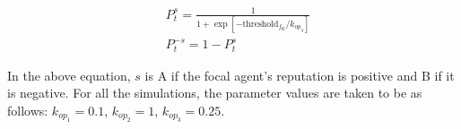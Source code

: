\documentclass[11pt, A4 paper, twocolumn ]{article}
\newcommand{\frm}{f_{\text{R}}}
\begin{document}
\begin{equation} \label{eq:optrfn2}
	\begin{split}
		&P_{t}^{s} = 	\frac{1}{1 + \exp[-\text{threshold}_{\frm}/k_{op_{3}}]} \\
		&P_{t}^{-s} = 1- P_{t}^{s}
	\end{split}
\end{equation}

In the above equation, $ s $ is A if the focal agent's reputation is positive and B if it is negative. For all the simulations, the parameter values are taken to be as follows: $ k_{op_{1}} = 0.1$, $ k_{op_{2}} = 1 $, $ k_{op_{3}} = 0.25 $.



\end{document}
